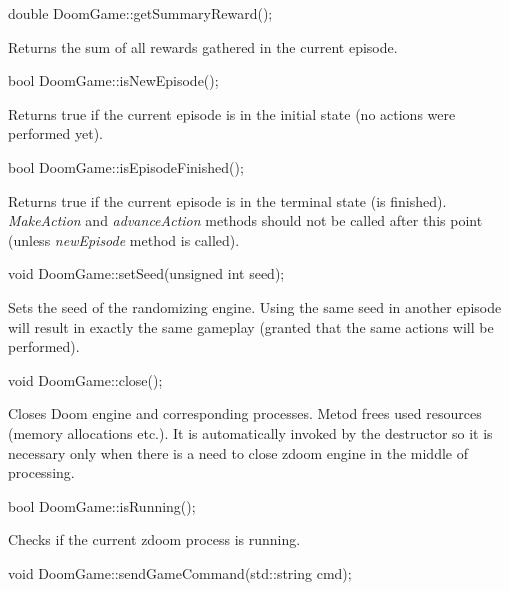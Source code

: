 \vspace{20pt}
\begin{clinee}
	double DoomGame::getSummaryReward();
\end{clinee}

	Returns the sum of all rewards gathered in the current episode.


\vspace{20pt}
\begin{clinee}
	bool DoomGame::isNewEpisode();
\end{clinee}

	Returns true if the current episode is in the initial state (no actions were performed yet).


\vspace{20pt}
\begin{clinee}
	bool DoomGame::isEpisodeFinished();
\end{clinee}

	Returns true if the current episode is in the terminal state (is finished). \emph{MakeAction} and \emph{advanceAction} methods should not be called after this point (unless \emph{newEpisode} method is called).


\vspace{20pt}
\begin{clinee}
	void DoomGame::setSeed(unsigned int seed);
\end{clinee}

	Sets the seed of the randomizing engine. Using the same seed in another episode will result in exactly the same gameplay (granted that the same actions will be performed).


\vspace{20pt}
\begin{clinee}
	void DoomGame::close();
\end{clinee}

	Closes Doom engine and corresponding processes. Metod frees used resources (memory allocations etc.). It is automatically invoked by the destructor so it is necessary only when there is a need to close zdoom engine in the middle of processing.


\vspace{20pt}
\begin{clinee}
	bool DoomGame::isRunning();
\end{clinee}
	
	Checks if the current zdoom process is running.


\vspace{20pt}
\begin{clinee}
	void DoomGame::sendGameCommand(std::string cmd);
\end{clinee}

